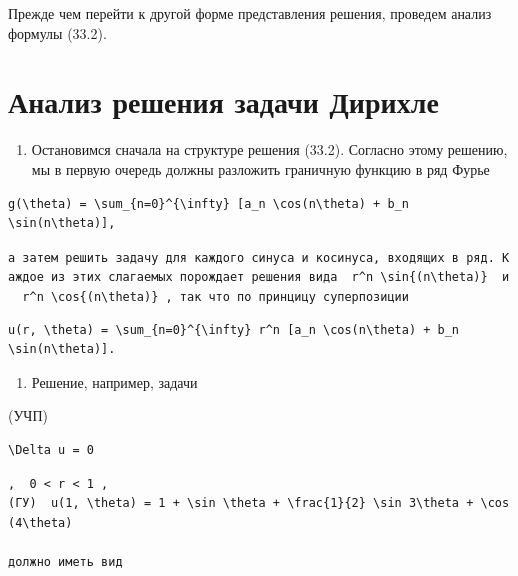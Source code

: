 \documentclass[
  ukrainian,
]{article}
\providecommand{\tightlist}{%
  \setlength{\itemsep}{0pt}\setlength{\parskip}{0pt}}
\begin{document}
Прежде чем перейти к другой форме представления решения, проведем анализ
формулы (33.2).

\section{Анализ решения задачи
Дирихле}\label{ux430ux43dux430ux43bux438ux437-ux440ux435ux448ux435ux43dux438ux44f-ux437ux430ux434ux430ux447ux438-ux434ux438ux440ux438ux445ux43bux435}

\begin{enumerate}
\def\labelenumi{\arabic{enumi}.}
\tightlist
\item
  Остановимся сначала на структуре решения (33.2). Согласно этому
  решению, мы в первую очередь должны разложить граничную функцию в ряд
  Фурье
\end{enumerate}

\begin{verbatim}
g(\theta) = \sum_{n=0}^{\infty} [a_n \cos(n\theta) + b_n \sin(n\theta)],
\end{verbatim}

\texttt{а\ затем\ решить\ задачу\ для\ каждого\ синуса\ и\ косинуса,\ входящих\ в\ ряд.\ Каждое\ из\ этих\ слагаемых\ порождает\ решения\ вида\ \ \textquotesingle{}r\^{}n\ \textbackslash{}sin\{(n\textbackslash{}theta)\}\textquotesingle{}\ \ и\ \ \textquotesingle{}r\^{}n\ \textbackslash{}cos\{(n\textbackslash{}theta)\}\textquotesingle{}\ ,\ так\ что\ по\ принцицу\ суперпозиции}

\begin{verbatim}
u(r, \theta) = \sum_{n=0}^{\infty} r^n [a_n \cos(n\theta) + b_n \sin(n\theta)].
\end{verbatim}

\begin{enumerate}
\def\labelenumi{\arabic{enumi}.}
\setcounter{enumi}{1}
\tightlist
\item
  Решение, например, задачи
\end{enumerate}

(УЧП)

\begin{verbatim}
\Delta u = 0
\end{verbatim}

\begin{verbatim}
,  0 < r < 1 ,  
(ГУ)  u(1, \theta) = 1 + \sin \theta + \frac{1}{2} \sin 3\theta + \cos (4\theta) 

должно иметь вид
\end{verbatim}
\end{document}
